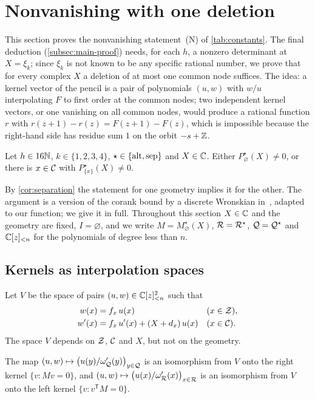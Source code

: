 \section{Nonvanishing with one deletion}\label{sec:nonvanishing}

This section proves the nonvanishing statement~(N) of \cref{tab:constants}. The final
deduction (\cref{subsec:main-proof}) needs, for each $h$, a nonzero determinant at
$X=\xi_k$; since $\xi_k$ is not known to be any specific rational number, we prove that for every
complex $X$ a deletion of at most one common node suffices. The idea: a kernel vector of the
pencil is a pair of polynomials $(u,w)$ with $w/u$ interpolating $F$ to first order at the
common nodes; two independent kernel vectors, or one vanishing on all common nodes, would produce
a rational function $r$ with $r(z+1)-r(z)=F(z+1)-F(z)$, which is impossible because the right-hand
side has residue sum $1$ on the orbit $-s+\mathbb{Z}$.

\begin{proposition}\label{prop:nonvanishing}
Let $h\in16\mathbb{N}$, $k\in\{1,2,3,4\}$, $\star\in\{\mathrm{alt},\mathrm{sep}\}$ and $X\in\mathbb{C}$. Either
$P^\star_\varnothing(X)\ne0$, or there is $x\in\mathcal{C}$ with $P^\star_{\{x\}}(X)\ne0$.
\end{proposition}

By \cref{cor:separation} the statement for one geometry implies it for the other. The argument
is a version of the corank bound by a discrete Wronskian in~\cite[\S5]{Litsey2026Lowner},
adapted to our function; we give it in full. Throughout this section $X\in\mathbb{C}$ and the geometry are
fixed, $I=\varnothing$, and we write $M=M^\star_\varnothing(X)$, $\mathcal{R}=\mathcal{R}^\star$,
$\mathcal{Q}=\mathcal{Q}^\star$ and $\mathbb{C}[z]_{<n}$ for the polynomials of degree less than $n$.

\subsection{Kernels as interpolation spaces}\label{subsec:kernel}

Let $V$ be the space of pairs $(u,w)\in\mathbb{C}[z]_{<n}^2$ such that
\begin{align}
  w(x)&=f_x\,u(x) && (x\in\mathcal{Z}),\label{eq:value-cond}\\
  w'(x)&=f_x\,u'(x)+(X+d_x)\,u(x) && (x\in\mathcal{C}).\label{eq:jet-cond}
\end{align}
The space $V$ depends on $\mathcal{Z}$, $\mathcal{C}$ and $X$, but not on the geometry.

\begin{lemma}\label{lem:kernel}
The map $(u,w)\mapsto\bigl(u(y)/\omega_{\mathcal{Q}}'(y)\bigr)_{y\in\mathcal{Q}}$ is an isomorphism from $V$ onto
the right kernel $\{v:Mv=0\}$, and $(u,w)\mapsto\bigl(u(x)/\omega_{\mathcal{R}}'(x)\bigr)_{x\in\mathcal{R}}$ is an
isomorphism from $V$ onto the left kernel $\{v:v^{\mathsf T}M=0\}$.
\end{lemma}

